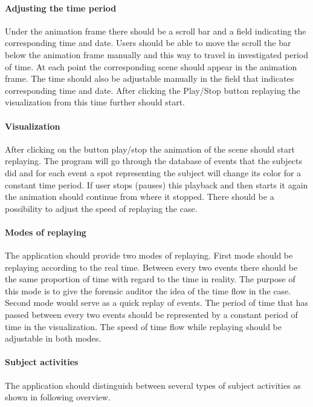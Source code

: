 \paragraph{Adjusting the time period}
Under the animation frame there should be a scroll bar and a field indicating the corresponding time and date. Users should be able to move the scroll the bar below the animation frame manually and this way to travel in investigated period of time. At each point the corresponding scene should appear in the animation frame. The time should also be adjustable manually in the field that indicates corresponding time and date. After clicking the Play/Stop button replaying the visualization from this time further should start. 

\paragraph{Visualization}
After clicking on the button play/stop the animation of the scene should start replaying. The program will go through the database of events that the subjects did and for each event a spot representing the subject will change its color for a constant time period. If user stops (pauses) this playback and then starts it again the animation should continue from where it stopped. There should be a possibility to adjust the speed of replaying the case. 

\paragraph{Modes of replaying}
The application should provide two modes of replaying. First mode should be replaying according to the real time. Between every two events there should be the same proportion of time with regard to the time in reality. The purpose of this mode is to give the forensic auditor the idea of the time flow in the case. Second mode would serve as a quick replay of events. The period of time that has passed between every two events should be represented by a constant period of time in the visualization. The speed of time flow while replaying should be adjustable in both modes.

\paragraph{Subject activities}
The application should distinguish between several types of subject activities as shown in following overview.

